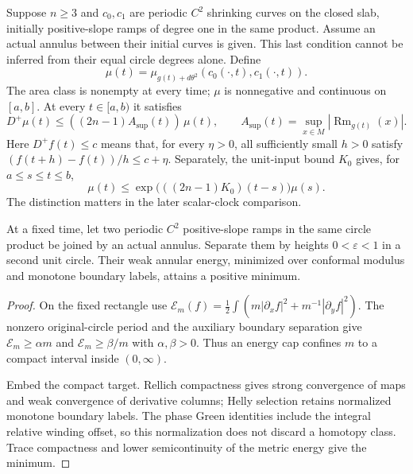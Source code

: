 \begin{proposition}
\label{prop:annular-evolution}
Suppose $n\ge3$ and $c_0,c_1$ are periodic $C^2$ shrinking curves on the
closed slab, initially positive-slope ramps of degree one in the same product.
Assume an actual annulus between their initial curves is given.  This last
condition cannot be inferred from their equal circle degrees alone.
Define
\[
 \mu(t)=\mu_{g(t)+d\theta^2}(c_0(\cdot,t),c_1(\cdot,t)).
\]
The area class is nonempty at every time; $\mu$ is nonnegative and continuous
on $[a,b]$.  At every $t\in[a,b)$ it satisfies
\begin{equation}
 D^+\mu(t)\le ((2n-1)A_{\sup}(t))\,\mu(t),
 \qquad A_{\sup}(t)=\sup_{x\in M}|\operatorname{Rm}_{g(t)}(x)|.
 \label{eq:annulus-forward}
\end{equation}
Here $D^+f(t)\le c$ means that, for every $\eta>0$, all sufficiently
small $h>0$ satisfy $(f(t+h)-f(t))/h\le c+\eta$.
Separately, the unit-input bound $K_0$ gives, for $a\le s\le t\le b$,
\begin{equation}
 \mu(t)\le\exp\bigl(((2n-1)K_0)(t-s)\bigr)\mu(s).
 \label{eq:annulus-exponential}
\end{equation}
The distinction matters in the later scalar-clock comparison.
\end{proposition}

\begin{lemma}
\label{lem:annular-weak-minimum}
At a fixed time, let two periodic $C^2$ positive-slope ramps in the
same circle product be joined by an actual annulus. Separate them
by heights $0<\varepsilon<1$ in a second unit circle. Their weak
annular energy, minimized over conformal modulus and monotone
boundary labels, attains a positive minimum.
\end{lemma}
\begin{proof}
On the fixed rectangle use
$\mathcal E_m(f)=\tfrac12\int(m|\partial_xf|^2+m^{-1}|\partial_yf|^2)$.
The nonzero original-circle period and the auxiliary boundary
separation give $\mathcal E_m\geq\alpha m$ and
$\mathcal E_m\geq\beta/m$ with $\alpha,\beta>0$. Thus an energy cap
confines $m$ to a compact interval inside $(0,\infty)$.

Embed the compact target. Rellich compactness gives strong convergence
of maps and weak convergence of derivative columns; Helly selection
retains normalized monotone boundary labels. The phase Green
identities include the integral relative winding offset, so this
normalization does not discard a homotopy class. Trace compactness
and lower semicontinuity of the metric energy give the minimum.
\end{proof}


